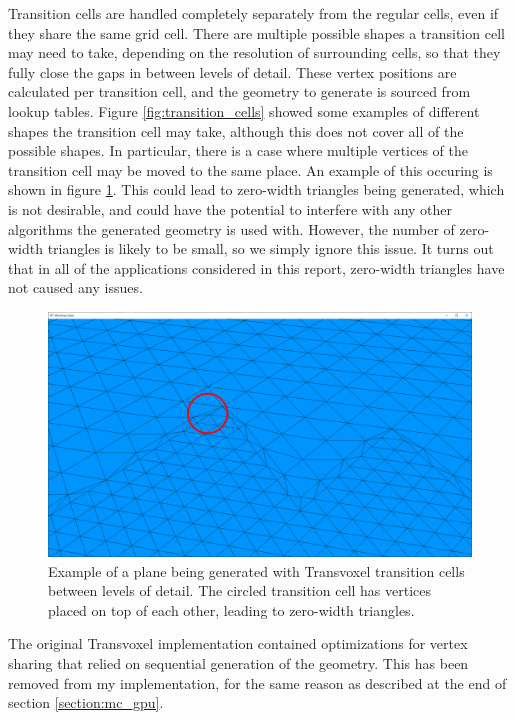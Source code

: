 \documentclass{article}
\begin{document}
\begin{enumerate}
Transition cells are handled completely separately from the regular cells, even if they share the same grid cell. There are multiple possible shapes a transition cell may need to take, depending on the resolution of surrounding cells, so that they fully close the gaps in between levels of detail. These vertex positions are calculated per transition cell, and the geometry to generate is sourced from lookup tables. Figure \ref{fig:transition_cells} showed some examples of different shapes the transition cell may take, although this does not cover all of the possible shapes. In particular, there is a case where multiple vertices of the transition cell may be moved to the same place. An example of this occuring is shown in figure \ref{fig:tv_transition_plane}. This could lead to zero-width triangles being generated, which is not desirable, and could have the potential to interfere with any other algorithms the generated geometry is used with. However, the number of zero-width triangles is likely to be small, so we simply ignore this issue. It turns out that in all of the applications considered in this report, zero-width triangles have not caused any issues.

\begin{figure}[H]
  \includegraphics[width=\textwidth]{tv_transition_plane}
  \caption{Example of a plane being generated with Transvoxel transition cells between levels of detail. The circled transition cell has vertices placed on top of each other, leading to zero-width triangles.}
  \label{fig:tv_transition_plane}
\end{figure}

\end{enumerate}

The original Transvoxel implementation contained optimizations for vertex sharing that relied on sequential generation of the geometry. This has been removed from my implementation, for the same reason as described at the end of section \ref{section:mc_gpu}.
\end{document}

